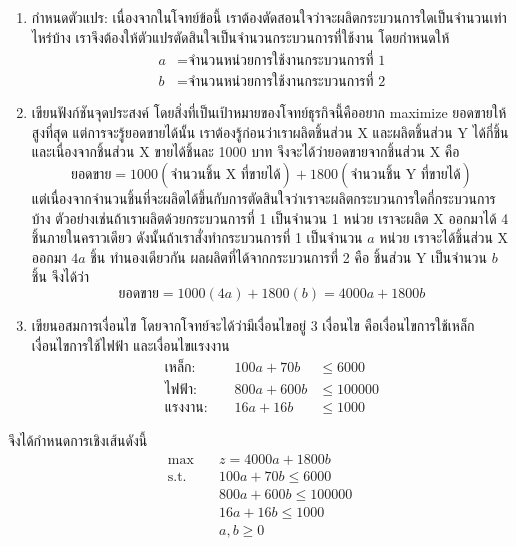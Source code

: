 \begin{solution}
    \begin{enumerate}[label=\textbf{ขั้นที่ \arabic*:}, align=left, labelwidth=5em, labelsep=1em, leftmargin=*, itemsep=16pt, topsep=0pt, parsep=0pt, partopsep=0pt]
    \item กำหนดตัวแปร: เนื่องจากในโจทย์ข้อนี้ เราต้องตัดสอนใจว่าจะผลิตกระบวนการใดเป็นจำนวนเท่าไหร่บ้าง เราจึงต้องให้ตัวแปรตัดสินใจเป็นจำนวนกระบวนการที่ใช้งาน โดยกำหนดให้
    \begin{align*}
        a &= \text{จำนวนหน่วยการใช้งานกระบวนการที่ 1}\\
        b &= \text{จำนวนหน่วยการใช้งานกระบวนการที่ 2}
    \end{align*}
    
    \item เขียนฟังก์ชันจุดประสงค์ โดยสิ่งที่เป็นเป้าหมายของโจทย์ธุรกิจนี้คืออยาก maximize ยอดขายให้สูงที่สุด  แต่การจะรู้ยอดขายได้นั้น เราต้องรู้ก่อนว่าเราผลิตชิ้นส่วน X และผลิตชิ้นส่วน Y ได้กี่ชิ้น และเนื่องจากชิ้นส่วน X ขายได้ชิ้นละ 1000 บาท จึงจะได้ว่ายอดขายจากชิ้นส่วน X คือ
    $$
    \text{ยอดขาย} = 1000(\text{จำนวนชิ้น X ที่ขายได้}) + 1800(\text{จำนวนชิ้น Y ที่ขายได้})
    $$
    แต่เนื่องจากจำนวนชิ้นที่จะผลิตได้ขึ้นกับการตัดสินใจว่าเราจะผลิตกระบวนการใดกี่กระบวนการบ้าง ตัวอย่างเช่นถ้าเราผลิตด้วยกระบวนการที่ 1 เป็นจำนวน 1 หน่วย เราจะผลิต X ออกมาได้ 4 ชิ้นภายในคราวเดียว ดังนั้นถ้าเราสั่งทำกระบวนการที่ 1 เป็นจำนวน $a$ หน่วย เราจะได้ชิ้นส่วน X ออกมา $4a$ ชิ้น ทำนองเดียวกัน ผลผลิตที่ได้จากกระบวนการที่ 2 คือ ชิ้นส่วน Y เป็นจำนวน $b$ ชิ้น จึงได้ว่า
    \begin{equation}
        \text{ยอดขาย} = 1000(4a) + 1800(b) = 4000a + 1800b \tag{1}
    \end{equation}
    \item เขียนอสมการเงื่อนไข โดยจากโจทย์จะได้ว่ามีเงื่อนไขอยู่ 3 เงื่อนไข คือเงื่อนไขการใช้เหล็ก เงื่อนไขการใช้ไฟฟ้า และเงื่อนไขแรงงาน
        \begin{align}
            \text{เหล็ก: }& &100a + 70b &\leq 6000 \tag{2} \\
            \text{ไฟฟ้า: }& &800a + 600b &\leq 100000 \tag{3} \\
            \text{แรงงาน: }& &16a + 16b &\leq 1000 \tag{4}
        \end{align}
\end{enumerate}
จึงได้กำหนดการเชิงเส้นดังนี้
\begin{align*}
\max  &\quad z=4000a + 1800b \\
\text{s.t.} &\quad100a + 70b \leq 6000\\
            &\quad800a + 600b \leq 100000\\
            &\quad16a + 16b \leq 1000\\
            &\quad a, b\geq0
\end{align*}
\end{solution}

